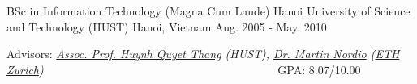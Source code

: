 \begin{cventries}
  \cventry
  { BSc in Information Technology (Magna Cum Laude)} %
  {Hanoi University of Science and Technology (HUST)} %
  {Hanoi, Vietnam} %
  {Aug. 2005 - May. 2010} %
  {
  	\begin{cvitems} %
	  	\item Advisors: {\em \href{http://www.soict.hut.edu.vn/~thanghq/}{Assoc. Prof. Huynh Quyet Thang}  (HUST), \href{http://se.inf.ethz.ch/people/nordio/}{Dr. Martin Nordio} (\href {http://se.inf.ethz.ch/}{ETH Zurich}) ~~~~~~~~~~~~~~~~~~~~~~~~~~~~~~~~~~~~~~~} GPA: 8.07/10.00 
  	\end{cvitems}
  }  

\end{cventries}




